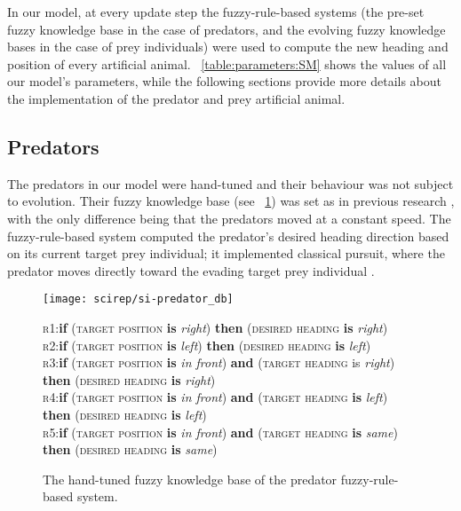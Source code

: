 In our model, at every update step the fuzzy-rule-based systems (\ie the pre-set fuzzy knowledge base in the case of predators, and the evolving fuzzy knowledge bases in the case of prey individuals) were used to compute the new heading and position of every artificial animal. \tablename~\ref{table:parameters:SM} shows the values of all our model's parameters, while the following sections provide more details about the implementation of the predator and prey artificial animal.

\subsection{Predators}
The predators in our model were hand-tuned and their behaviour was not subject to evolution. Their fuzzy knowledge base (see \figurename~\ref{figure:predator}) was set as in previous research \cite{demsar2014simulated}, with the only difference being that the predators moved at a constant speed. The fuzzy-rule-based system computed the predator's desired heading direction based on its current target prey individual; it implemented classical pursuit, where the predator moves directly toward the evading target prey individual \cite{kane2014falcons,nahin2012chases}.

\begin{figure}
  \texttt{[image: scirep/si-predator\_db]}\\
  \scriptsize
  \vspace*{3mm}
  \begin{minipage}{\figurewidth}
    \textsc{r}1:\quad \textbf{if} (\textsc{target position} \textbf{is} \emph{right}) \textbf{then} (\textsc{desired heading} \textbf{is} \emph{right})\\
    \textsc{r}2:\quad \textbf{if} (\textsc{target position} \textbf{is} \emph{left}) \textbf{then} (\textsc{desired heading} \textbf{is} \emph{left}) \\
    \textsc{r}3:\quad \textbf{if} (\textsc{target position} \textbf{is} \emph{in front}) \textbf{and} (\textsc{target heading} is \emph{right}) \textbf{then} (\textsc{desired heading} \textbf{is} \emph{right})\\
    \textsc{r}4:\quad \textbf{if} (\textsc{target position} \textbf{is} \emph{in front}) \textbf{and} (\textsc{target heading} \textbf{is} \emph{left}) \textbf{then} (\textsc{desired heading} \textbf{is} \emph{left})\\
    \textsc{r}5:\quad \textbf{if} (\textsc{target position} \textbf{is} \emph{in front}) \textbf{and} (\textsc{target heading} \textbf{is} \emph{same}) \textbf{then} (\textsc{desired heading} \textbf{is} \emph{same})
  \end{minipage}
  \caption{The hand-tuned fuzzy knowledge base of the predator fuzzy-rule-based system.}
  \label{figure:predator}
\end{figure}

